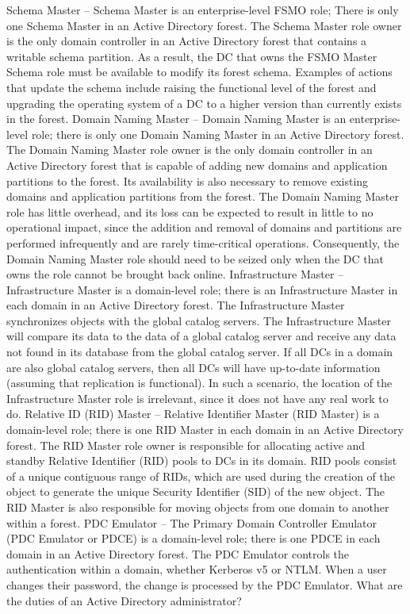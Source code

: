 Schema Master – Schema Master is an enterprise-level FSMO role; There is only one Schema Master in an Active Directory forest. The Schema Master role owner is the only domain controller in an Active Directory forest that contains a writable schema partition. As a result, the DC that owns the FSMO Master Schema role must be available to modify its forest schema. Examples of actions that update the schema include raising the functional level of the forest and upgrading the operating system of a DC to a higher version than currently exists in the forest. 
Domain Naming Master – Domain Naming Master is an enterprise-level role; there is only one Domain Naming Master in an Active Directory forest. The Domain Naming Master role owner is the only domain controller in an Active Directory forest that is capable of adding new domains and application partitions to the forest. Its availability is also necessary to remove existing domains and application partitions from the forest. The Domain Naming Master role has little overhead, and its loss can be expected to result in little to no operational impact, since the addition and removal of domains and partitions are performed infrequently and are rarely time-critical operations. Consequently, the Domain Naming Master role should need to be seized only when the DC that owns the role cannot be brought back online.
Infrastructure Master – Infrastructure Master is a domain-level role; there is an Infrastructure Master in each domain in an Active Directory forest. The Infrastructure Master synchronizes objects with the global catalog servers. The Infrastructure Master will compare its data to the data of a global catalog server and receive any data not found in its database from the global catalog server. If all DCs in a domain are also global catalog servers, then all DCs will have up-to-date information (assuming that replication is functional). In such a scenario, the location of the Infrastructure Master role is irrelevant, since it does not have any real work to do.
Relative ID (RID) Master – Relative Identifier Master (RID Master) is a domain-level role; there is one RID Master in each domain in an Active Directory forest. The RID Master role owner is responsible for allocating active and standby Relative Identifier (RID) pools to DCs in its domain. RID pools consist of a unique contiguous range of RIDs, which are used during the creation of the object to generate the unique Security Identifier (SID) of the new object. The RID Master is also responsible for moving objects from one domain to another within a forest.
PDC Emulator – The Primary Domain Controller Emulator (PDC Emulator or PDCE) is a domain-level role; there is one PDCE in each domain in an Active Directory forest. The PDC Emulator controls the authentication within a domain, whether Kerberos v5 or NTLM. When a user changes their password, the change is processed by the PDC Emulator.
What are the duties of an Active Directory administrator?

